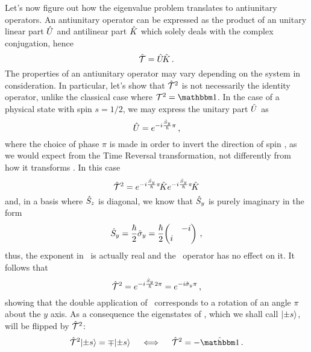             Let's now figure out how the eigenvalue problem translates to antiunitary operators. An antiunitary operator can be expressed \cite{Sakurai2020-pu} as the product of an unitary linear part $\hat{U}$ and antilinear part $\hat{K}$ which solely deals with the complex conjugation, hence
            \begin{equation}
                \label{eq:antiunitary-operator}
                \mathcal{\hat{T}} = \hat{U}\!\hat{K}
                \,\text{.}
            \end{equation}
            The properties of an antiunitary operator may vary depending on the system in consideration. In particular, let's show that $\mathcal{\hat{T}}^2$ is not necessarily the identity operator, unlike the classical case where $\mcT^2 = \idM$. In the case of a physical state with spin $s = 1/2$, we may express the unitary part $\hat{U}$ as
            \begin{equation*}
                \hat{U} = e^{-i \frac{\hat{S}_y}{\hbar} \pi}
                \,\text{,}
            \end{equation*}
            where the choice of phase $\pi$ is made in order to invert the direction of spin \hvS, as we would expect from the Time Reversal transformation, not differently from how it transforms \hvp. In this case
            \begin{equation*}
                \mathcal{\hat{T}}^2 = e^{-i \frac{\hat{S}_y}{\hbar} \pi}\! \hat{K} e^{-i \frac{\hat{S}_y}{\hbar} \pi}\! \hat{K}
            \end{equation*}
            and, in a basis where $\hat{S}_z$ is diagonal, we know that $\hat{S}_y$ is purely imaginary in  the form
            \begin{equation*}
                \hSy
                = \frac{\hbar}{2} \togglehat{\sigma}_y
                = \frac{\hbar}{2} \!\pmqty{\admat{-i,i}}
                \mycomma
            \end{equation*}
            thus, the exponent in \hU\ is actually real and the \hK\ operator has no effect on it. It follows that
            \begin{equation*}
                \mathcal{\hat{T}}^2
                = e^{-i \frac{\hat{S}_y}{\hbar} 2\pi}
                = e^{-i \hat{\sigma}_y \pi}
                \,\text{,}
            \end{equation*}
            showing that the double application of \hT\ corresponds to a rotation of an angle $\pi$ about the $y$ axis. As a consequence the eigenstates of \hSz, which we shall call $\ket{\pm s}$, will be flipped by $\mathcal{\hat{T}}^2$:
            \begin{equation*}
                \hT^2 \!\ket{\pm s} = \mp\! \ket{\pm s}
                \quad\iff\quad
                \hT^2 = -\togglehat{\idM}
                \myperiod
            \end{equation*}

